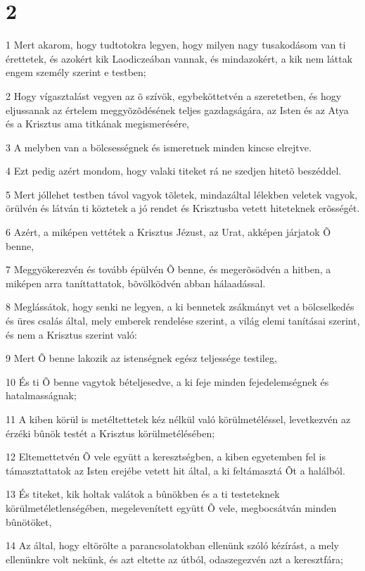 \chapter{2}

\par 1 Mert akarom, hogy tudtotokra legyen, hogy milyen nagy tusakodásom van ti érettetek, és azokért kik Laodiczeában vannak, és mindazokért, a kik nem láttak engem személy szerint e testben;
\par 2 Hogy vígasztalást vegyen az õ szívök, egybeköttetvén a szeretetben, és hogy eljussanak az értelem meggyõzõdésének teljes gazdagságára, az Isten és az Atya és a Krisztus ama titkának megismerésére,
\par 3 A melyben van a bölcsességnek és ismeretnek minden kincse elrejtve.
\par 4 Ezt pedig azért mondom, hogy valaki titeket rá ne szedjen hitetõ beszéddel.
\par 5 Mert jóllehet testben távol vagyok tõletek, mindazáltal lélekben veletek vagyok, örülvén és látván ti köztetek a jó rendet és Krisztusba vetett hiteteknek erõsségét.
\par 6 Azért, a miképen vettétek a Krisztus Jézust, az Urat, akképen járjatok Õ benne,
\par 7 Meggyökerezvén és tovább épülvén Õ benne, és megerõsödvén a hitben, a miképen arra taníttattatok, bõvölködvén abban hálaadással.
\par 8 Meglássátok, hogy senki ne legyen, a ki bennetek zsákmányt vet a bölcselkedés és üres csalás által, mely emberek rendelése szerint, a világ elemi tanításai szerint, és nem a Krisztus szerint való:
\par 9 Mert Õ benne lakozik az istenségnek egész teljessége testileg,
\par 10 És ti Õ benne vagytok bételjesedve, a ki feje minden fejedelemségnek és hatalmasságnak;
\par 11 A kiben körül is metéltettetek kéz nélkül való körülmetéléssel, levetkezvén az érzéki bûnök testét a Krisztus körülmetélésében;
\par 12 Eltemettetvén Õ vele együtt a keresztségben, a kiben egyetemben fel is támasztattatok az Isten erejébe vetett hit által, a ki feltámasztá Õt a halálból.
\par 13 És titeket, kik holtak valátok a bûnökben és a ti testeteknek körülmetéletlenségében, megelevenített együtt Õ vele, megbocsátván minden bûnötöket,
\par 14 Az által, hogy eltörölte a parancsolatokban ellenünk szóló kézírást, a mely ellenünkre volt nekünk, és azt eltette az útból, odaszegezvén azt a keresztfára;
